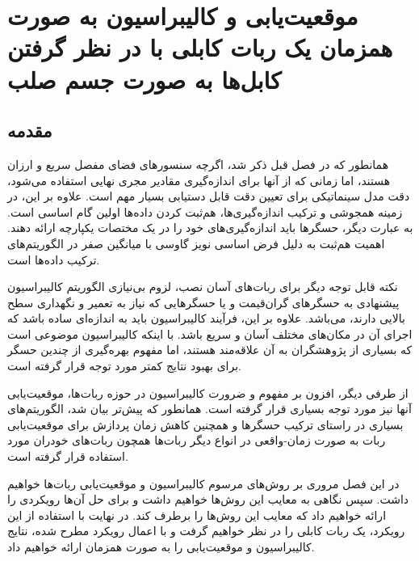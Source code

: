 \chapter{موقعیت‌یابی و کالیبراسیون به صورت همزمان یک ربات کابلی با در نظر گرفتن کابل‌ها به صورت جسم صلب}

\section{مقدمه}
همانطور که در فصل قبل ذکر شد، اگرچه سنسورهای فضای مفصل سریع و ارزان هستند، اما زمانی که از آنها برای اندازه‌گیری مقادیر مجری نهایی استفاده می‌شود، دقت مدل سینماتیکی برای تعیین دقت قابل دستیابی بسیار مهم است. علاوه بر این، در زمینه همجوشی و ترکیب اندازه‌گیری‌ها، هم‌ثبت کردن داده‌ها
\cite{hall1997introduction} 
 اولین گام اساسی است. به عبارت دیگر، حسگرها باید اندازه‌گیری‌های خود را در یک مختصات یکپارچه ارائه دهند. اهمیت هم‌ثبت به دلیل فرض اساسی نویز گاوسی با میانگین صفر در الگوریتم‌های ترکیب داده‌ها است.
 
 نکته قابل توجه دیگر برای ربات‌های آسان نصب، لزوم بی‌نیازی الگوریتم کالیبراسیون پیشنهادی به حسگرهای گران‌قیمت و یا حسگرهایی که نیاز به تعمیر و نگهداری سطح بالایی دارند، می‌باشد. علاوه بر این، فرآیند کالیبراسیون باید به اندازه‌ای ساده باشد که اجرای آن در مکان‌های مختلف آسان و سریع باشد. با اینکه کالیبراسیون موضوعی است که بسیاری از پژوهشگران به آن علاقه‌مند هستند، اما مفهوم بهره‌گیری از چندین حسگر برای بهبود نتایج کمتر مورد توجه قرار گرفته است.
 

از طرفی دیگر، افزون بر مفهوم و ضرورت کالیبراسیون در حوزه ربات‌ها، موقعیت‌یابی آنها نیز مورد توجه بسیاری قرار گرفته است. همانطور که پیش‌تر بیان شد، الگوریتم‌های بسیاری در راستای ترکیب حسگرها و همچنین کاهش زمان پردازش برای موقعیت‌یابی ربات به صورت زمان-واقعی در انواع دیگر ربات‌ها همچون ربات‌های خودران مورد استفاده قرار گرفته است.

در این فصل مروری بر روش‌های مرسوم کالیبراسیون و موقعیت‌یابی ربات‌ها خواهیم داشت. سپس نگاهی به معایب این روش‌ها خواهیم داشت و برای حل آن‌ها رویکردی را ارائه خواهیم داد که معایب این روش‌ها را برطرف کند. در نهایت با استفاده از این رویکرد، یک ربات کابلی را در نظر خواهیم گرفت و با اعمال رویکرد مطرح شده، نتایج کالیبراسیون و موقعیت‌یابی را به صورت همزمان ارائه خواهیم داد.

